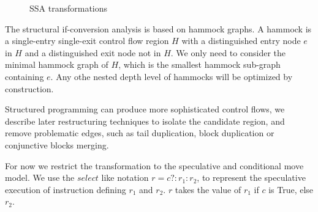 \begin{figure}[h]
\centering

\caption{SSA transformations}
\label{fig: phi_operations}
\end{figure}

The structural if-conversion analysis is based on hammock graphs. A hammock is a single-entry single-exit control flow region $H$ with a distinguished entry node $e$ in $H$ and a distinguished exit node not in $H$. We only need to consider the minimal hammock graph of $H$, which is the smallest hammock sub-graph containing $e$. Any othe nested depth level of hammocks will be optimized by construction.

Structured programming can produce more sophisticated control flows, we describe later restructuring techniques to isolate the candidate region, and remove problematic edges, such as tail duplication, block duplication or conjunctive blocks merging. 

For now we restrict the transformation to the speculative and conditional move model. We use the $select$ like notation $r=c?:r_1:r_2$, to represent the speculative execution of instruction defining $r_1$ and $r_2$. $r$ takes the value of $r_1$ if $c$ is True, else $r_2$. 


